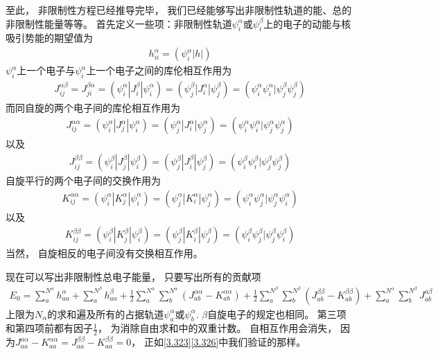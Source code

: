 至此，
非限制性\hft 方程已经推导完毕，
我们已经能够写出非限制性轨道的能、总的非限制性能量等等。
首先定义一些项：非限制性轨道$\psi_i^\alpha$或$\psi_i^\beta$上的电子的动能与核吸引势能的期望值为
\begin{align}
	h_{ii}^\alpha = (\psi_i^\alpha|h|)
\end{align}
$\psi_i^\alpha$上一个电子与$\psi_i^\alpha$上一个电子之间的库伦相互作用为
\begin{align}
	J_{ij}^{\alpha\beta} = J_{ji}^{\beta\alpha} = (\psi_i^\alpha|J_{i}^\beta|\psi_i^\alpha) = (\psi_j^\beta|J_{i}^\alpha|\psi_j^\beta) = (\psi_i^\alpha\psi_i^\alpha|\psi_j^\beta\psi_j^\beta)
\end{align}
而同自旋的两个电子间的库伦相互作用为
\begin{align}
	J_{i j}^{\alpha \alpha}=(\psi_{i}^{\alpha}|J_{j}^{\alpha}| \psi_{i}^{\alpha})=(\psi_{j}^{\alpha}|J_{i}^{\alpha}| \psi_{j}^{\alpha})=(\psi_{i}^{\alpha} \psi_{i}^{\alpha} | \psi_{j}^{\alpha} \psi_{j}^{\alpha})
\end{align}
以及
\begin{align}
	J_{i j}^{\beta \beta}=(\psi_{i}^{\beta}|J_{j}^{\beta}| \psi_{i}^{\beta})=(\psi_{j}^{\beta}|J_{i}^{\beta}| \psi_{j}^{\beta})=(\psi_{i}^{\beta} \psi_{i}^{\beta} | \psi_{j}^{\beta} \psi_{j}^{\beta})
\end{align}
自旋平行的两个电子间的交换作用为
\begin{align}
	K_{i j}^{\alpha\alpha}=(\psi_{i}^{\alpha}|K_{j}^{\alpha}| \psi_{i}^{\alpha})=(\psi_{j}^{\alpha}|K_{i}^{\alpha}| \psi_{j}^{\alpha})=(\psi_{i}^{\alpha} \psi_{j}^{\alpha} | \psi_{j}^{\alpha} \psi_{i}^{\alpha})
\end{align}
以及
\begin{align}
	K_{i j}^{\beta\beta}=(\psi_{i}^{\beta}|K_{j}^{\beta}| \psi_{i}^{\beta})=(\psi_{j}^{\beta}|K_{i}^{\beta}| \psi_{j}^{\beta})=(\psi_{i}^{\beta} \psi_{j}^{\beta} | \psi_{j}^{\beta} \psi_{i}^{\beta})
\end{align}
当然，
自旋相反的电子间没有交换相互作用。


现在可以写出非限制性总电子能量，
只要写出所有的贡献项
\begin{align}
	E_{0}=\sum_{a}^{N^{\alpha}} h_{a a}^{\alpha}+\sum_{a}^{N^{\beta}} h_{a a}^{\beta}+\frac{1}{2} \sum_{a}^{N^{\alpha}} \sum_{b}^{N^{\alpha}}\left(J_{a b}^{\alpha \alpha}-K_{a b}^{\alpha \alpha}\right)+\frac{1}{2} \sum_{a}^{N^{\beta}} \sum_{b}^{N^{\beta}}\left(J_{a b}^{\beta \beta}-K_{a b}^{\beta \beta}\right)+\sum_{a}^{N^{\alpha}} \sum_{b}^{N^{\beta}} J_{a b}^{a \beta}
\end{align}
上限为$N_\alpha$的求和遍及所有的占据轨道$\psi_a^\alpha$或$\psi_b^\alpha$. 
$\beta$自旋电子的规定也相同。 
第三项和第四项前都有因子$\frac{1}{2}$，
为消除自由求和中的双重计数。
自相互作用会消失，
因为$J_{a a}^{a \alpha}-K_{a a}^{\alpha \alpha}=J_{a a}^{\beta \beta}-K_{a a}^{\beta \beta}=0$，
正如\eqref{3.323}\eqref{3.326}中我们验证的那样。

